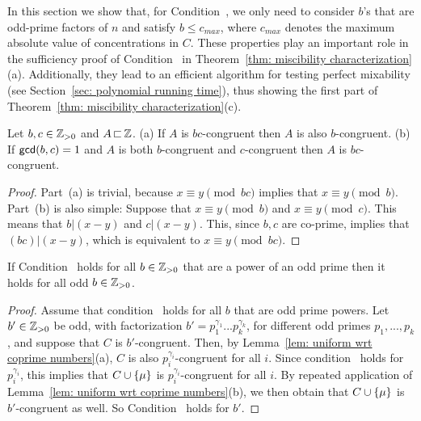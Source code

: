 

%




In this section we show that, for Condition~{\MixCond},
we only need to consider $b$'s that are odd-prime factors of $n$
and satisfy $b\leq c_{max}$,
where $c_{max}$ denotes the maximum absolute value of concentrations in $C$.
These properties play an important role in the sufficiency proof of Condition~{\MixCond} in 
Theorem~\ref{thm: miscibility characterization}(a).
Additionally, they lead to an efficient algorithm for testing perfect mixability
(see Section~\ref{sec: polynomial running time}), 
thus showing the first part of Theorem~\ref{thm: miscibility characterization}(c). 


\begin{lemma}\label{lem: uniform wrt coprime numbers}
Let $b,c\in{\mathbb{Z}_{> 0}}$ and $A{\,\sqsubset\,} {\mathbb Z}$.
(a) If $A$ is $bc$-congruent then $A$ is also $b$-congruent.
(b) If ${\textsf{gcd}}(b,c) = 1$ and $A$ is both $b$-congruent and $c$-congruent
	then $A$ is $bc$-congruent.
\end{lemma}

\begin{proof}
Part~(a) is trivial, because $x\equiv y\pmod{bc}$ implies that
$x\equiv y\pmod{b}$.
Part~(b) is also simple: Suppose that $x\equiv y\pmod{b}$
and $x\equiv y\pmod{c}$. This means that $b|(x-y)$ and $c|(x-y)$.
This, since $b,c$ are co-prime, implies that $(bc)|(x-y)$, 
which is equivalent to $x\equiv y\pmod{bc}$.
\end{proof}


\begin{lemma}\label{lem: mc powers of primes}
If Condition~{\MixCond} holds for all $b\in{\mathbb{Z}_{> 0}}$ that are a power of an odd prime
then it holds for all odd $b\in{\mathbb{Z}_{> 0}}$.
\end{lemma}

\begin{proof}
Assume that condition~{\MixCond} holds for all $b$ that are odd prime powers. 
Let $b'\in{\mathbb{Z}_{> 0}}$ be odd, with factorization
$b' = p_1^{\gamma_1} ... p_k^{\gamma_k}$,
for different odd primes $p_1 , ...,p_k$, and suppose that $C$ is $b'$-congruent.
Then, by Lemma~\ref{lem: uniform wrt coprime numbers}(a),
$C$ is also  $p_i^{\gamma_i}$-congruent for all $i$.
Since condition~{\MixCond} holds for $p_i^{\gamma_i}$,
this implies that $C\cup{ \left\{ \mu \right\} }$ is $p_i^{\gamma_i}$-congruent for all $i$.
By repeated application of Lemma~\ref{lem: uniform wrt coprime numbers}(b), we then obtain that
$C\cup{ \left\{ \mu \right\} }$ is $b'$-congruent as well. So Condition~{\MixCond} holds for $b'$.
\end{proof}

